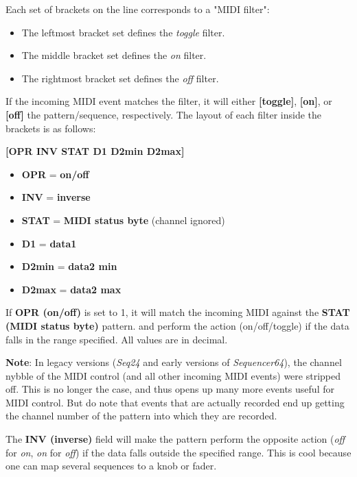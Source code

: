    Each set of brackets on the line corresponds to a "MIDI filter":

   \begin{itemize}
      \item The leftmost bracket set defines the \textsl{toggle} filter.
      \item The middle bracket set defines the \textsl{on} filter.
      \item The rightmost bracket set defines the \textsl{off} filter.
   \end{itemize}

   If the incoming MIDI event matches the filter, it will either
   \textbf{[toggle]}, \textbf{[on]}, or \textbf{[off]}
   the pattern/sequence, respectively.
   The layout of each filter inside the brackets is as follows:

      \textbf{[OPR INV STAT D1 D2min D2max]}

   \begin{itemize}
      \item \textbf{OPR} = \textbf{on/off}
      \item \textbf{INV} = \textbf{inverse}
      \item \textbf{STAT} = \textbf{MIDI status byte} (channel ignored) 
      \item \textbf{D1} = \textbf{data1}
      \item \textbf{D2min} = \textbf{data2 min}
      \item \textbf{D2max} = \textbf{data2 max}
   \end{itemize}

   If \textbf{OPR (on/off)} is set to 1, it will match the incoming MIDI
   against the \textbf{STAT (MIDI status byte)} pattern.
   and perform the action (on/off/toggle) if the data
   falls in the range specified.  All values are in decimal.

   \textbf{Note}: In legacy versions (\textsl{Seq24} and early versions
   of \textsl{Sequencer64}), the channel nybble of the MIDI control (and all
   other incoming MIDI events) were stripped off.
   This is no longer the case, and thus opens up many more events useful for
   MIDI control.   But do note that events that are actually recorded end up
   getting the channel number of the pattern into which they are recorded.

   The \textbf{INV (inverse)} field will make the pattern perform the opposite
   action (\textsl{off} for \textsl{on}, \textsl{on} for \textsl{off}) if the
   data falls outside the specified range.  This is cool because one can map
   several sequences to a knob or fader.

